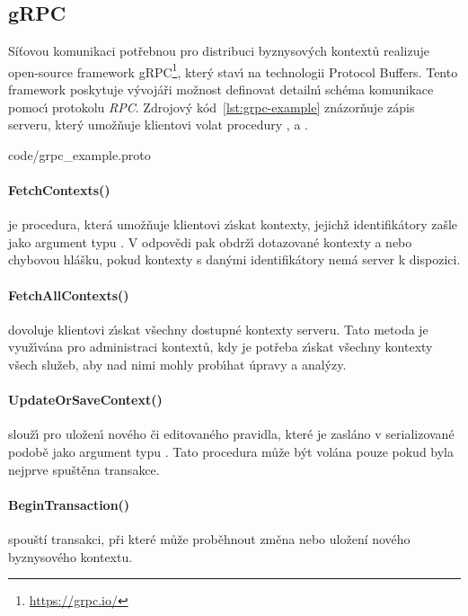\subsection{gRPC}

Síťovou komunikaci potřebnou pro distribuci byznysových kontextů realizuje
open-source framework gRPC\footnote{\url{https://grpc.io/}}, kter\'y stav\'{\i}
na technologii Protocol Buffers. Tento framework poskytuje v\'yvojáři
možnost definovat detailn\'{\i} schéma komunikace pomoc\'{\i} protokolu \textit{\gls{RPC}}.
Zdrojov\'y kód~\ref{lst:grpc-example} znázorňuje zápis serveru,
kter\'y umožňuje klientovi volat procedury ,
 a .


{code/grpc_example.proto}

\paragraph{FetchContexts()} je procedura, která umožňuje klientovi
z\'{\i}skat kontexty, jejichž identifikátory zašle jako argument
typu .
V odpovědi pak obdrž\'{\i} dotazované kontexty a nebo chybovou hlášku,
pokud kontexty s dan\'ymi identifikátory nemá server k dispozici.

\paragraph{FetchAllContexts()} dovoluje klientovi z\'{\i}skat všechny
dostupné kontexty serveru. Tato metoda je využ\'{\i}vána pro administraci
kontextů, kdy je potřeba z\'{\i}skat všechny kontexty všech služeb, aby
nad nimi mohly prob\'{\i}hat úpravy a anal\'yzy.

\paragraph{UpdateOrSaveContext()} slouž\'{\i} pro uložen\'{\i} nového či
editovaného pravidla, které je zasláno v serializované podobě
jako argument typu .
Tato procedura může být volána pouze pokud byla nejprve spuštěna transakce.

\paragraph{BeginTransaction()} spouští transakci, při které může proběhnout
změna nebo uložení nového byznysového kontextu.

